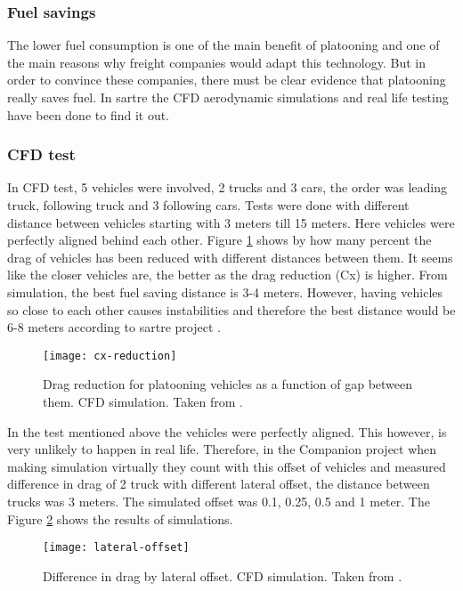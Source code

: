\subsubsection{Fuel savings}\label{sec:fuel-savings}
% 
The lower fuel consumption is one of the main benefit of platooning and one of the main reasons why freight companies would adapt this technology. But in order to convince these companies, there must be clear evidence that platooning really saves fuel. In \acrshort{sartre} \cite{Chan2012ProjectSARTRE} the \acrfull{CFD} aerodynamic simulations and real life testing have been done to find it out.
%
\subsubsection*{\acrshort{CFD} test}
In \acrshort{CFD} test, 5 vehicles were involved, 2 trucks and 3 cars, the order was leading truck, following truck and 3 following cars. Tests were done with different distance between vehicles starting with 3 meters till 15 meters. Here vehicles were perfectly aligned behind each other. Figure \ref{fig:cx-reduction} shows by how many percent the drag of vehicles has been reduced with different distances between them. It seems like the closer vehicles are, the better as the drag reduction (Cx) is higher. From simulation, the best fuel saving distance is 3-4 meters. However, having vehicles so close to each other causes instabilities and therefore the best distance would be 6-8 meters according to \acrshort{sartre} project \cite[p. 33]{Chan2012ProjectSARTRE}.\par
% 
\begin{figure}[p]
    \centering
    \texttt{[image: cx-reduction]}
    \caption{Drag reduction for platooning vehicles as a function of gap between them. \acrshort{CFD} simulation. Taken from \cite{Chan2012ProjectSARTRE}.}
    \label{fig:cx-reduction}
\end{figure}
% 
In the test mentioned above the vehicles were perfectly aligned. This however, is very unlikely to happen in real life. Therefore, in the Companion \cite{2016CompanionProject} project when making simulation virtually they count with this offset of vehicles and measured difference in drag of 2 truck with different lateral offset, the distance between trucks was 3 meters. The simulated offset was 0.1, 0.25, 0.5 and 1 meter. The Figure \ref{fig:lateral-offset} shows the results of simulations.
% 
\begin{figure}[p]
    \centering
    \texttt{[image: lateral-offset]}
    \caption{Difference in drag by lateral offset. \acrshort{CFD} simulation. Taken from \cite[p. 19]{Laxhammar2015CooperativeConsumption}.}
    \label{fig:lateral-offset}
\end{figure}
